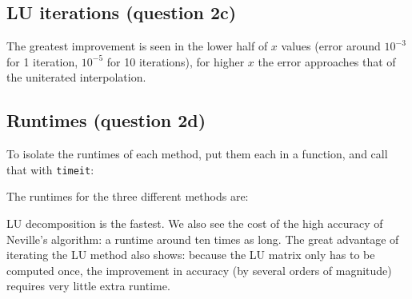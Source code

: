 \subsection{LU iterations (question 2c)}
The greatest improvement is seen in the lower half of $x$ values (error around $10^{-3}$ for 1 iteration, $10^{-5}$ for 10 iterations), for higher $x$ the error approaches that of the uniterated interpolation.


\subsection{Runtimes (question 2d)}
To isolate the runtimes of each method, put them each in a function, and call that with \texttt{timeit}:


The runtimes for the three different methods are:


LU decomposition is the fastest.
We also see the cost of the high accuracy of Neville's algorithm: a runtime around ten times as long.
The great advantage of iterating the LU method also shows: because the LU matrix only has to be computed once, the improvement in accuracy (by several orders of magnitude) requires very little extra runtime.



